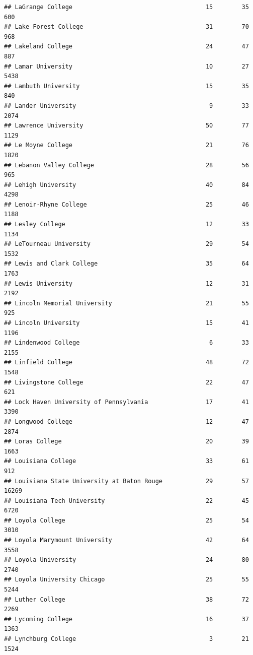 \documentclass[
]{article}
\begin{document}
\begin{verbatim}
## LaGrange College                                     15        35         600
## Lake Forest College                                  31        70         968
## Lakeland College                                     24        47         887
## Lamar University                                     10        27        5438
## Lambuth University                                   15        35         840
## Lander University                                     9        33        2074
## Lawrence University                                  50        77        1129
## Le Moyne College                                     21        76        1820
## Lebanon Valley College                               28        56         965
## Lehigh University                                    40        84        4298
## Lenoir-Rhyne College                                 25        46        1188
## Lesley College                                       12        33        1134
## LeTourneau University                                29        54        1532
## Lewis and Clark College                              35        64        1763
## Lewis University                                     12        31        2192
## Lincoln Memorial University                          21        55         925
## Lincoln University                                   15        41        1196
## Lindenwood College                                    6        33        2155
## Linfield College                                     48        72        1548
## Livingstone College                                  22        47         621
## Lock Haven University of Pennsylvania                17        41        3390
## Longwood College                                     12        47        2874
## Loras College                                        20        39        1663
## Louisiana College                                    33        61         912
## Louisiana State University at Baton Rouge            29        57       16269
## Louisiana Tech University                            22        45        6720
## Loyola College                                       25        54        3010
## Loyola Marymount University                          42        64        3558
## Loyola University                                    24        80        2740
## Loyola University Chicago                            25        55        5244
## Luther College                                       38        72        2269
## Lycoming College                                     16        37        1363
## Lynchburg College                                     3        21        1524

\end{verbatim}
\end{document}
